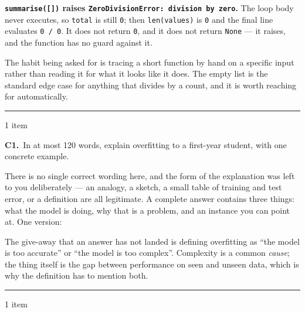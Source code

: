\documentclass[10pt,a4paper]{article}
\newcommand{\parthead}[2]{\vspace{2pt}\noindent\rule{\linewidth}{0.4pt}\par\vspace{2pt}%
  \noindent{\bfseries Block #1}\hfill{\small #2}\par\vspace{1pt}}
\newcommand{\sol}[1]{\textbf{#1}}
\begin{document}
\sol{\texttt{summarise([])} raises \texttt{ZeroDivisionError: division by zero}.} The loop body never
executes, so \texttt{total} is still \texttt{0}; then \texttt{len(values)} is \texttt{0} and the final
line evaluates \texttt{0 / 0}. It does not return \texttt{0}, and it does not return \texttt{None} --- it
raises, and the function has no guard against it.

The habit being asked for is tracing a short function by hand on a specific input rather than reading
it for what it looks like it does. The empty list is the standard edge case for anything that divides
by a count, and it is worth reaching for automatically.

\parthead{C --- Explain it}{1 item}

\textbf{C1.}\ In at most 120 words, explain overfitting to a first-year student, with one concrete
example.

\vspace{2pt}

There is no single correct wording here, and the form of the explanation was left to you deliberately
--- an analogy, a sketch, a small table of training and test error, or a definition are all legitimate.
A complete answer contains three things: what the model is doing, why that is a problem, and an
instance you can point at. One version:

\vspace{3pt}
\noindent{}
\vspace{3pt}

The give-away that an answer has not landed is defining overfitting as ``the model is too accurate''
or ``the model is too complex''. Complexity is a common \emph{cause}; the thing itself is the gap
between performance on seen and unseen data, which is why the definition has to mention both.

\parthead{D --- Debug}{1 item}
\end{document}
